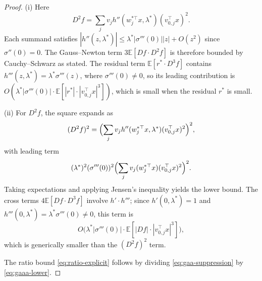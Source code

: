 \documentclass[10pt,a4paper]{amsart}
\begin{document}
\begin{proof}
(i) Here
\[
  D^2f=\sum_j v_j h''(w_j^{*\top}x,\lambda^*)(v_{0,j}^\top x)^2.
\]
Each summand satisfies $|h''(z,\lambda^*)|\le\lambda^*|\sigma'''(0)||z|+O(z^2)$ since $\sigma''(0)=0$.  The Gauss--Newton term $3\mathbb E[Df\cdot D^2f]$ is therefore bounded by Cauchy--Schwarz as stated.  The residual term $\mathbb E[r^*\cdot D^3f]$ contains $h'''(z,\lambda^*)=\lambda^*\sigma'''(z)$, where $\sigma'''(0)\neq 0$, so its leading contribution is $O(\lambda^*|\sigma'''(0)|\cdot\mathbb E[|r^*|\cdot|v_{0,j}^\top x|^3])$, which is small when the residual $r^*$ is small.

(ii) For $D^2f$, the square expands as
\[
  (D^2f)^2=\Bigl(\sum_j v_j h''(w_j^{*\top}x,\lambda^*)(v_{0,j}^\top x)^2\Bigr)^2,
\]
with leading term
\[
  (\lambda^*)^2(\sigma'''(0))^2\Bigl(\sum_j v_j(w_j^{*\top}x)(v_{0,j}^\top x)^2\Bigr)^2.
\]
Taking expectations and applying Jensen's inequality yields the lower bound.  The cross terms $4\mathbb E[Df\cdot D^3f]$ involve $h'\cdot h'''$; since $h'(0,\lambda^*)=1$ and $h'''(0,\lambda^*)=\lambda^*\sigma'''(0)\neq 0$, this term is
\[
  O\bigl(\lambda^*|\sigma'''(0)|\cdot\mathbb E[|Df|\cdot|v_{0,j}^\top x|^3]\bigr),
\]
which is generically smaller than the $(D^2f)^2$ term.

The ratio bound \eqref{eq:ratio-explicit} follows by dividing \eqref{eq:gaa-suppression} by \eqref{eq:gaaa-lower}.
\end{proof}
\end{document}
